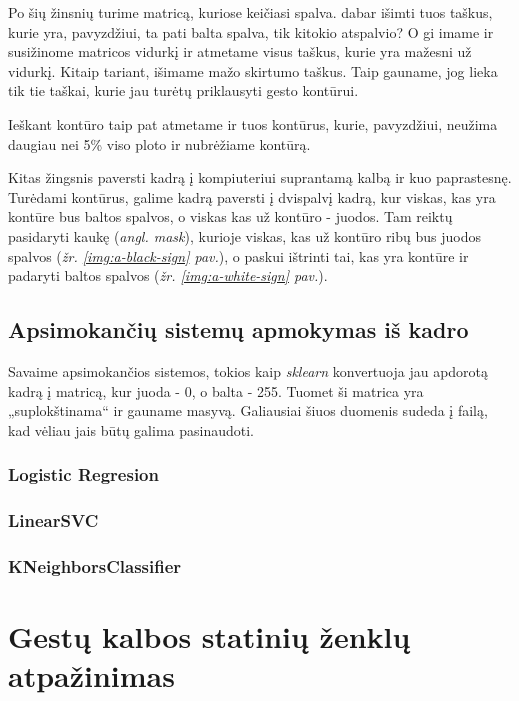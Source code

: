 \documentclass{VUMIFInfKursinis}
\begin{document}
Po šių žinsnių turime matricą, kuriose keičiasi spalva. dabar išimti tuos taškus, kurie yra, pavyzdžiui, ta pati balta spalva, tik kitokio atspalvio? O gi imame ir susižinome matricos vidurkį ir atmetame visus taškus, kurie yra mažesni už vidurkį. Kitaip tariant, išimame mažo skirtumo taškus. Taip gauname, jog lieka tik tie taškai, kurie jau turėtų priklausyti gesto kontūrui. 

Ieškant kontūro taip pat atmetame ir tuos kontūrus, kurie, pavyzdžiui, neužima daugiau nei 5\% viso ploto ir nubrėžiame kontūrą.

Kitas žingsnis paversti kadrą į kompiuteriui suprantamą kalbą ir kuo paprastesnę. Turėdami kontūrus, galime kadrą paversti į dvispalvį kadrą, kur viskas, kas yra kontūre bus baltos spalvos, o viskas kas už kontūro - juodos. Tam reiktų pasidaryti kaukę (\textit{angl. mask}), kurioje viskas, kas už kontūro ribų bus juodos spalvos (\textit{žr. \ref{img:a-black-sign} pav.}), o paskui ištrinti tai, kas yra kontūre ir padaryti baltos spalvos (\textit{žr. \ref{img:a-white-sign} pav.}).

\subsection{Apsimokančių sistemų apmokymas iš kadro}
Savaime apsimokančios sistemos, tokios kaip \textit{sklearn} konvertuoja jau apdorotą kadrą į matricą, kur juoda - 0, o balta - 255. Tuomet ši matrica yra „suplokštinama“ ir gauname masyvą. Galiausiai šiuos duomenis sudeda į failą, kad vėliau jais būtų galima pasinaudoti.
\subsubsection{Logistic Regresion}
\subsubsection{LinearSVC}
\subsubsection{KNeighborsClassifier}


\section{Gestų kalbos statinių ženklų atpažinimas}
\end{document}

